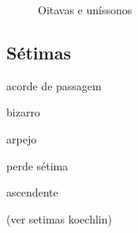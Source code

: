 \documentclass{article}
\begin{document}
\begin{figure}
{  }
  \qquad
  \caption{Oitavas e uníssonos}
  \label{fig:oitavas-e-unissonos}
\end{figure}


\subsection{Sétimas}
\label{sec:setimas}

acorde de passagem

bizarro

arpejo

perde sétima

ascendente

(ver setimas koechlin)
\end{document}
